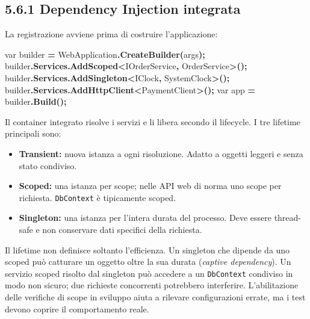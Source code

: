 \documentclass[
  italian,
  10pt,
]{book}
\newenvironment{Shaded}{\begin{snugshade}}{\end{snugshade}}
\newcommand{\DataTypeTok}[1]{\textcolor[rgb]{0.13,0.29,0.53}{#1}}
\newcommand{\FunctionTok}[1]{\textcolor[rgb]{0.13,0.29,0.53}{\textbf{#1}}}
\newcommand{\NormalTok}[1]{#1}
\newcommand{\OperatorTok}[1]{\textcolor[rgb]{0.81,0.36,0.00}{\textbf{#1}}}
\providecommand{\tightlist}{%
  \setlength{\itemsep}{0pt}\setlength{\parskip}{0pt}}
\begin{document}
\subsection{5.6.1 Dependency Injection
integrata}\label{dependency-injection-integrata}

La registrazione avviene prima di costruire l'applicazione:

\begin{Shaded}
\begin{Highlighting}[]
\DataTypeTok{var}\NormalTok{ builder }\OperatorTok{=}\NormalTok{ WebApplication}\OperatorTok{.}\FunctionTok{CreateBuilder}\OperatorTok{(}\NormalTok{args}\OperatorTok{);}
\NormalTok{builder}\OperatorTok{.}\FunctionTok{Services}\OperatorTok{.}\FunctionTok{AddScoped}\OperatorTok{\textless{}}\NormalTok{IOrderService}\OperatorTok{,}\NormalTok{ OrderService}\OperatorTok{\textgreater{}();}
\NormalTok{builder}\OperatorTok{.}\FunctionTok{Services}\OperatorTok{.}\FunctionTok{AddSingleton}\OperatorTok{\textless{}}\NormalTok{IClock}\OperatorTok{,}\NormalTok{ SystemClock}\OperatorTok{\textgreater{}();}
\NormalTok{builder}\OperatorTok{.}\FunctionTok{Services}\OperatorTok{.}\FunctionTok{AddHttpClient}\OperatorTok{\textless{}}\NormalTok{PaymentClient}\OperatorTok{\textgreater{}();}
\DataTypeTok{var}\NormalTok{ app }\OperatorTok{=}\NormalTok{ builder}\OperatorTok{.}\FunctionTok{Build}\OperatorTok{();}
\end{Highlighting}
\end{Shaded}

Il container integrato risolve i servizi e li libera secondo il
lifecycle. I tre lifetime principali sono:

\begin{itemize}
\tightlist
\item
  \textbf{Transient:} nuova istanza a ogni risoluzione. Adatto a oggetti
  leggeri e senza stato condiviso.
\item
  \textbf{Scoped:} una istanza per scope; nelle API web di norma uno
  scope per richiesta. \texttt{DbContext} è tipicamente scoped.
\item
  \textbf{Singleton:} una istanza per l'intera durata del processo. Deve
  essere thread-safe e non conservare dati specifici della richiesta.
\end{itemize}

Il lifetime non definisce soltanto l'efficienza. Un singleton che
dipende da uno scoped può catturare un oggetto oltre la sua durata
(\emph{captive dependency}). Un servizio scoped risolto dal singleton
può accedere a un \texttt{DbContext} condiviso in modo non sicuro; due
richieste concorrenti potrebbero interferire. L'abilitazione delle
verifiche di scope in sviluppo aiuta a rilevare configurazioni errate,
ma i test devono coprire il comportamento reale.
\end{document}
